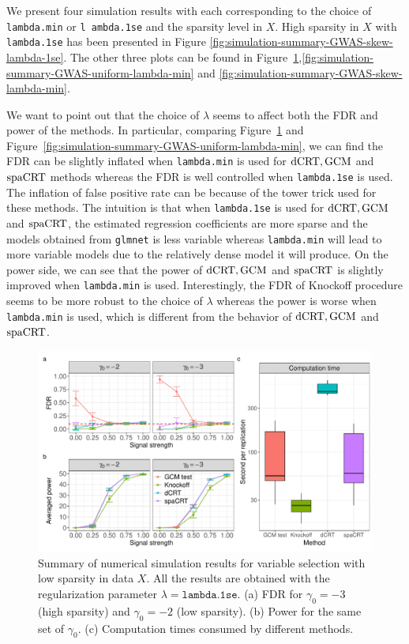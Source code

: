 \documentclass[12pt]{article}
\theoremstyle{definition}
\newcommand{\dCRT}{\textnormal{dCRT}} 					%
\newcommand{\GCM}{\textnormal{GCM}}						%
\newcommand{\spacrt}{\textnormal{spaCRT}}               %
\begin{document}
We present four simulation results with each corresponding to the choice of \texttt{lambda.min} or \texttt{l
ambda.1se} and the sparsity level in $X$. High sparsity in $X$ with \texttt{lambda.1se} has been presented in Figure \ref{fig:simulation-summary-GWAS-skew-lambda-1se}. The other three plots can be found in Figure~\ref{fig:simulation-summary-GWAS-uniform-lambda-1se},\ref{fig:simulation-summary-GWAS-uniform-lambda-min} and \ref{fig:simulation-summary-GWAS-skew-lambda-min}.

We want to point out that the choice of $\lambda$ seems to affect both the FDR and power of the methods. In particular, comparing Figure~\ref{fig:simulation-summary-GWAS-uniform-lambda-1se} and Figure~\ref{fig:simulation-summary-GWAS-uniform-lambda-min}, we can find the FDR can be slightly inflated when \texttt{lambda.min} is used for $\dCRT,\GCM$ and $\spacrt$ methods whereas the FDR is well controlled when \texttt{lambda.1se} is used. The inflation of false positive rate can be because of the tower trick used for these methods. The intuition is that when \texttt{lambda.1se} is used for $\dCRT,\GCM$ and $\spacrt$, the estimated regression coefficients are more sparse and the models obtained from \texttt{glmnet} is less variable whereas \texttt{lambda.min} will lead to more variable models due to the relatively dense model it will produce. On the power side, we can see that the power of $\dCRT,\GCM$ and $\spacrt$ is slightly improved when \texttt{lambda.min} is used. Interestingly, the FDR of Knockoff procedure seems to be more robust to the choice of $\lambda$ whereas the power is worse when \texttt{lambda.min} is used, which is different from the behavior of $\dCRT,\GCM$ and $\spacrt$. 

\begin{figure}[!ht]
  \centering
  \includegraphics[width=1.0\textwidth]{figures-and-tables/simulation/HMM-variable-selection/HMM_simulation_uniform_lambda.1se.pdf}
  \caption{Summary of numerical simulation results for variable selection  with low sparsity in data $X$. All the results are obtained with the regularization parameter $\lambda=\texttt{lambda.1se}$. (a) FDR for $\gamma_0=-3$ (high sparsity) and $\gamma_0=-2$ (low sparsity). (b) Power for the same set of $\gamma_0$. (c) Computation times consumed by different methods. }
  \label{fig:simulation-summary-GWAS-uniform-lambda-1se}
\end{figure}
\end{document}

